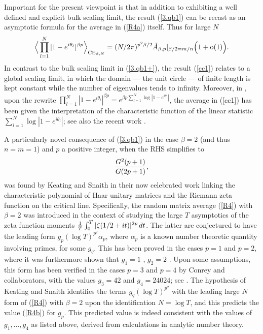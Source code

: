 \documentclass[11pt,a4paper]{article}
\numberwithin{equation}{section} %
\theoremstyle{plain}
\theoremstyle{definition}
\numberwithin{prop}{section}
\numberwithin{cor}{section}
\numberwithin{remark}{section}
\begin{document}
Important for the present viewpoint is that in addition to exhibiting a well defined and explicit bulk scaling limit, the result (\ref{3.qb1}) can be recast as an asymptotic formula for the average in (\ref{R4a}) itself. Thus for large $N$
\begin{equation}\label{cc1}
\Big \langle   \prod_{l=1}^N |1 - e^{i \theta_l}|^{\beta p}
 \Big  \rangle_{{\rm CE}_{\beta,N}}
 = (N/2\pi)^{p^2 \beta/2}
 \tilde{A}_{\beta,p} |_{\beta/2=m/n} \Big ( 1 + {\rm o}(1) \Big ).
\end{equation}
In contrast to the bulk scaling limit in (\ref{3.qb1+}), the result (\ref{cc1}) relates to a global scaling limit, in which the domain --- the unit circle --- of finite length is kept constant while the number of eigenvalues tends to infinity. Moreover, 
in \cite{BF97f}, upon the rewrite $  \prod_{l=1}^N |1 - e^{i \theta_l}|^{\beta p} = e^{\beta p \sum_{l=1}^N \log |1 - e^{i \theta_l}|}$, the average
in (\ref{cc1}) has been given the interpretation of the characteristic function of the linear statistic $ \sum_{l=1}^N \log |1 - e^{i \theta_l}|$; see
also the recent work \cite{BD23}. 

A particularly novel consequence of (\ref{3.qb1}) in the case $\beta = 2$ (and thus $n=m=1$) and $p$ a positive integer,
when the RHS simplifies to
 \begin{equation}\label{R4b} 
 { G^2(p+1) \over
G(2p+1) },
\end{equation}
was found by Keating and Snaith \cite{KS00a} in their now celebrated work linking the characteristic polynomial of Haar unitary matrices
and the Riemann zeta function on the critical line. Specifically, the random matrix average (\ref{R4}) with $\beta = 2$ was introduced in the context
of studying the large $T$ asymptotics of the zeta function moments ${1 \over T} \int_0^T | \zeta(1/2+it)|^{2p} \, dt$. The latter are conjectured to
have the leading form $g_p (\log T)^{p^2} \alpha_p$, where $\alpha_p$ is a known number theoretic quantity involving primes, for some
$g_q$. This has been proved in the cases $p=1$ and $p=2$, where it was furthermore shown that
$g_1 = 1$ \cite{HL18}, $g_2=2$ \cite{In26}. Upon some assumptions, this form has been verified in the cases $p=3$ and $p=4$ by
Conrey and collaborators, with the values $g_3 = 42$ and $g_4 = 24024$; see \cite{CG01}. The hypothesis of Keating and Snaith identifies
the terms $g_q  (\log T)^{p^2} $ with the leading large $N$ form of (\ref{R4}) with $\beta = 2$ upon the identification $N = \log T$, and this
predicts the value (\ref{R4b}) for $g_p$. This predicted value is indeed consistent with the values of $g_1,\dots,g_4$ as listed above, derived
from  calculations in analytic number theory.
\end{document}
